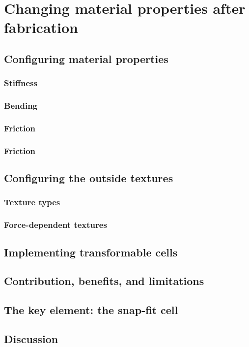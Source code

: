\chapter{Changing material properties after fabrication}

\section{Configuring material properties}
\subsection{Stiffness}
\subsection{Bending}
\subsection{Friction}
\subsection{Friction}

\section{Configuring the outside textures}
\subsection{Texture types}
\subsection{Force-dependent textures}

\section{Implementing transformable cells}

\section{Contribution, benefits, and limitations}

\section{The key element: the snap-fit cell}


\section{Discussion}